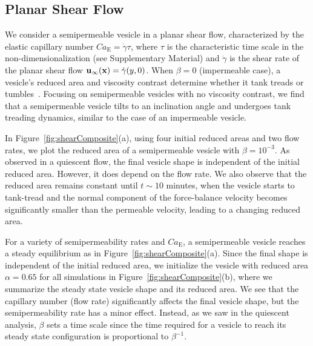 \documentclass[9pt,twocolumn,twoside,lineno]{pnas-new}
\begin{document}
\subsection*{Planar Shear Flow}

We consider a semipermeable vesicle in a planar shear flow, characterized by the elastic capillary number
$Ca_\mathrm{E}=\dot{\gamma}\tau$, where $\tau$ is the characteristic time scale in the non-dimensionalization (see Supplementary Material) and
$\dot{\gamma}$ is the shear rate of the planar shear flow
$\mathbf{u}_{\infty}(\mathbf{x}) = \dot{\gamma} (y,0)$.
 When $\beta=0$ (impermeable
case), a vesicle's reduced area and viscosity contrast determine whether
it tank treads or tumbles~\cite{fin-lam-sei-gom2008,
kra-win-sei-lip1996}. Focusing on semipermeable vesicles with no
viscosity contrast, we find that a semipermeable vesicle tilts to an
inclination angle and undergoes tank treading dynamics, similar to the
case of an impermeable vesicle.

In Figure~\ref{fig:shearComposite}(a), using four initial reduced areas
and two flow rates, we plot the reduced area of a semipermeable vesicle
with $\beta = 10^{-3}$. As observed in a quiescent flow, the final
vesicle shape is independent of the initial reduced area. However, it
does depend on the flow rate. We also observe that the reduced area
remains constant until $t\sim 10$ minutes, when the vesicle starts to
tank-tread and the normal component of the force-balance velocity
becomes significantly smaller than the permeable velocity, leading to a
changing reduced area.

For a variety of semipermeability rates and $Ca_\mathrm{E}$, a semipermeable
vesicle reaches a steady equilibrium as in
Figure~\ref{fig:shearComposite}(a). Since the final shape is independent
of the initial reduced area, we initialize the vesicle with reduced area
$\alpha = 0.65$ for all simulations in
Figure~\ref{fig:shearComposite}(b), where we summarize the steady state
vesicle shape and its reduced area. We see that the capillary number (flow rate)
significantly affects the final vesicle shape, but the semipermeability
rate has a minor effect. Instead, as we saw in the quiescent analysis,
$\beta$ sets a time scale since the time required for a vesicle to reach
its steady state configuration is proportional to $\beta^{-1}$.

\end{document}
